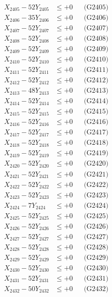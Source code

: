 \documentclass[a4paper,10pt]{article}
\begin{document}
{\begin{align}
X_{2405} - 52Y_{2405} &\leq +0 && \text{(G2405)} \\
X_{2406} - 35Y_{2406} &\leq +0 && \text{(G2406)} \\
X_{2407} - 52Y_{2407} &\leq +0 && \text{(G2407)} \\
X_{2408} - 52Y_{2408} &\leq +0 && \text{(G2408)} \\
X_{2409} - 52Y_{2409} &\leq +0 && \text{(G2409)} \\
X_{2410} - 52Y_{2410} &\leq +0 && \text{(G2410)} \\
\allowbreak
X_{2411} - 52Y_{2411} &\leq +0 && \text{(G2411)} \\
X_{2412} - 52Y_{2412} &\leq +0 && \text{(G2412)} \\
X_{2413} - 48Y_{2413} &\leq +0 && \text{(G2413)} \\
X_{2414} - 52Y_{2414} &\leq +0 && \text{(G2414)} \\
X_{2415} - 52Y_{2415} &\leq +0 && \text{(G2415)} \\
X_{2416} - 52Y_{2416} &\leq +0 && \text{(G2416)} \\
X_{2417} - 52Y_{2417} &\leq +0 && \text{(G2417)} \\
X_{2418} - 52Y_{2418} &\leq +0 && \text{(G2418)} \\
X_{2419} - 52Y_{2419} &\leq +0 && \text{(G2419)} \\
X_{2420} - 52Y_{2420} &\leq +0 && \text{(G2420)} \\
\allowbreak
X_{2421} - 52Y_{2421} &\leq +0 && \text{(G2421)} \\
X_{2422} - 52Y_{2422} &\leq +0 && \text{(G2422)} \\
X_{2423} - 52Y_{2423} &\leq +0 && \text{(G2423)} \\
X_{2424} - 7Y_{2424} &\leq +0 && \text{(G2424)} \\
X_{2425} - 52Y_{2425} &\leq +0 && \text{(G2425)} \\
X_{2426} - 52Y_{2426} &\leq +0 && \text{(G2426)} \\
X_{2427} - 52Y_{2427} &\leq +0 && \text{(G2427)} \\
X_{2428} - 52Y_{2428} &\leq +0 && \text{(G2428)} \\
X_{2429} - 52Y_{2429} &\leq +0 && \text{(G2429)} \\
X_{2430} - 52Y_{2430} &\leq +0 && \text{(G2430)} \\
\allowbreak
X_{2431} - 52Y_{2431} &\leq +0 && \text{(G2431)} \\
X_{2432} - 50Y_{2432} &\leq +0 && \text{(G2432)} \\

\end{align}}
\end{document}
